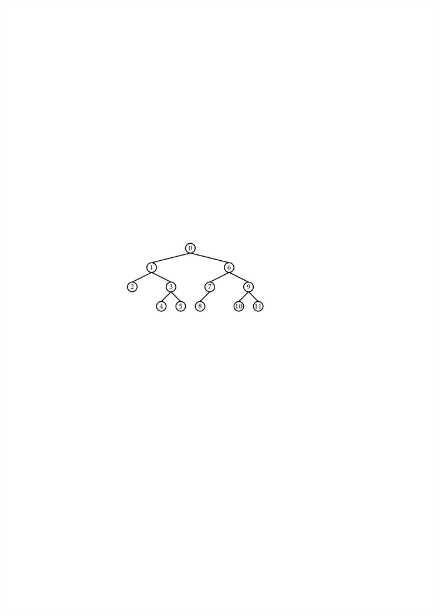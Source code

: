 \begin{figure}
  \begin{center}
    \includegraphics[scale=0.90909]{figs/binarytree-numbering-1}

\end{center}
\end{figure}
